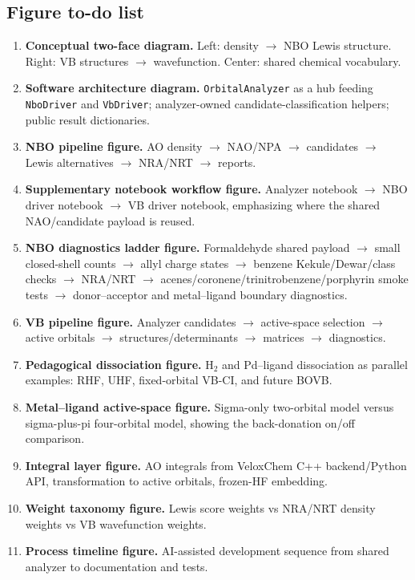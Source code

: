 \documentclass[11pt]{article}
\begin{document}
\subsection*{Figure to-do list}

\begin{enumerate}[leftmargin=*]
	\item \textbf{Conceptual two-face diagram.} Left: density $\rightarrow$ NBO Lewis structure. Right: VB structures $\rightarrow$ wavefunction. Center: shared chemical vocabulary.
	\item \textbf{Software architecture diagram.} \texttt{OrbitalAnalyzer} as a hub feeding \texttt{NboDriver} and \texttt{VbDriver}; analyzer-owned candidate-classification helpers; public result dictionaries.
	\item \textbf{NBO pipeline figure.} AO density $\rightarrow$ NAO/NPA $\rightarrow$ candidates $\rightarrow$ Lewis alternatives $\rightarrow$ NRA/NRT $\rightarrow$ reports.
	\item \textbf{Supplementary notebook workflow figure.} Analyzer notebook $\rightarrow$ NBO driver notebook $\rightarrow$ VB driver notebook, emphasizing where the shared NAO/candidate payload is reused.
	\item \textbf{NBO diagnostics ladder figure.} Formaldehyde shared payload $\rightarrow$ small closed-shell counts $\rightarrow$ allyl charge states $\rightarrow$ benzene Kekule/Dewar/class checks $\rightarrow$ NRA/NRT $\rightarrow$ acenes/coronene/trinitrobenzene/porphyrin smoke tests $\rightarrow$ donor--acceptor and metal--ligand boundary diagnostics.
	\item \textbf{VB pipeline figure.} Analyzer candidates $\rightarrow$ active-space selection $\rightarrow$ active orbitals $\rightarrow$ structures/determinants $\rightarrow$ matrices $\rightarrow$ diagnostics.
	\item \textbf{Pedagogical dissociation figure.} H$_2$ and Pd--ligand dissociation as parallel examples: RHF, UHF, fixed-orbital VB-CI, and future BOVB.
	\item \textbf{Metal--ligand active-space figure.} Sigma-only two-orbital model versus sigma-plus-pi four-orbital model, showing the back-donation on/off comparison.
	\item \textbf{Integral layer figure.} AO integrals from VeloxChem C++ backend/Python API, transformation to active orbitals, frozen-HF embedding.
	\item \textbf{Weight taxonomy figure.} Lewis score weights vs NRA/NRT density weights vs VB wavefunction weights.
	\item \textbf{Process timeline figure.} AI-assisted development sequence from shared analyzer to documentation and tests.
\end{enumerate}
\end{document}
